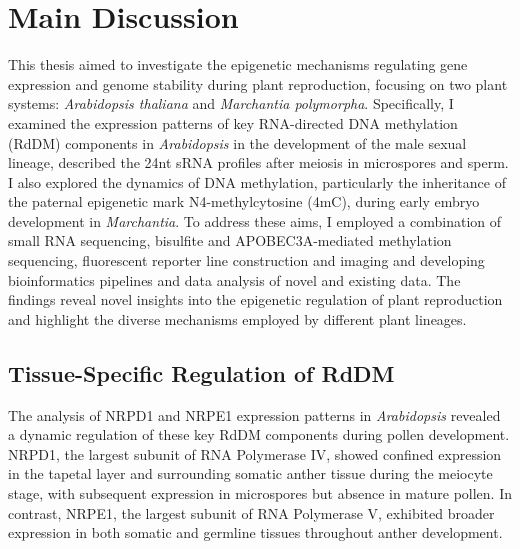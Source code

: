 \chapter{Main Discussion}

\ifpdf
    \graphicspath{{Chapter4/Figs/}}
\else
    \graphicspath{{Chapter3/Figs/}}
\fi


This thesis aimed to investigate the epigenetic mechanisms regulating gene expression and genome stability during plant reproduction, focusing on two plant systems: \textit{Arabidopsis thaliana} and \textit{Marchantia polymorpha}. Specifically, I examined the expression patterns of key RNA-directed DNA methylation (RdDM) components in \textit{Arabidopsis} in the development of the male sexual lineage, described the 24nt sRNA profiles after meiosis in microspores and sperm. I also explored the dynamics of DNA methylation, particularly the inheritance of the paternal epigenetic mark N4-methylcytosine (4mC), during early embryo development in \textit{Marchantia}. To address these aims, I employed a combination of small RNA sequencing, bisulfite and APOBEC3A-mediated methylation sequencing,  fluorescent reporter line construction and imaging and developing bioinformatics pipelines and data analysis of novel and existing data. The findings reveal novel insights into the epigenetic regulation of plant reproduction and highlight the diverse mechanisms employed by different plant lineages.

\section{Tissue-Specific Regulation of RdDM}

The analysis of NRPD1 and NRPE1 expression patterns in \textit{Arabidopsis} revealed a dynamic regulation of these key RdDM components during pollen development. NRPD1, the largest subunit of RNA Polymerase IV, showed confined expression in the tapetal layer and surrounding somatic anther tissue during the meiocyte stage, with subsequent expression in microspores but absence in mature pollen. In contrast, NRPE1, the largest subunit of RNA Polymerase V, exhibited broader expression in both somatic and germline tissues throughout anther development. 

